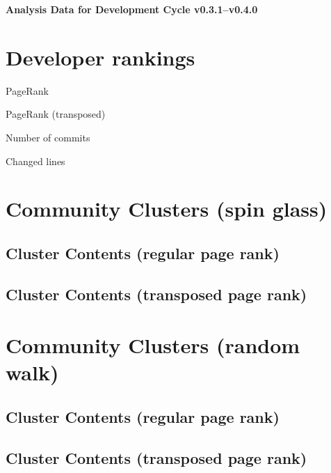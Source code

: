 \documentclass{article}
\begin{document}
\setlength{\parindent}{0pt}
\begin{center}
\begin{Large}
\textbf{Analysis Data for Development Cycle v0.3.1--v0.4.0}
\end{Large}
\end{center}
\section{Developer rankings}
\begin{small}\renewcommand{\tabcolsep}{1pt}
\begin{minipage}{0.5\linewidth}
PageRank\\

\end{minipage}%
\begin{minipage}{0.5\linewidth}
PageRank (transposed)\\

\end{minipage}

\renewcommand{\tabcolsep}{5pt}
\begin{minipage}{0.5\linewidth}
Number of commits\\

\end{minipage}%
\begin{minipage}{0.5\linewidth}
Changed lines\\

\end{minipage}
\end{small}
\newpage\section{Community Clusters (spin glass)}
\subsection{Cluster Contents (regular page rank)}
\newpage\subsection{Cluster Contents (transposed page rank)}
\newpage\section{Community Clusters (random walk)}
\subsection{Cluster Contents (regular page rank)}
\newpage\subsection{Cluster Contents (transposed page rank)}
\end{document}
